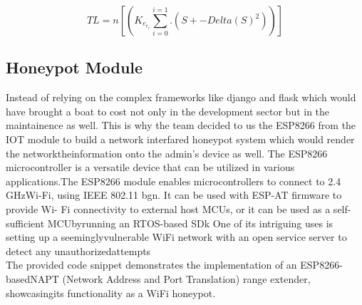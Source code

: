\documentclass[letterpaper, 10 pt, conference]{ieeeconf}  %
\begin{document}
\begin{equation}
TL = n[(K_e_r_r \sum_{i=0}^{i=1} . (S +- Delta(S)^2) )]
\end{equation}
















\subsection{Honeypot Module}
Instead of relying on the complex frameworks like django and flask which would have brought a boat to cost not only in the development sector but in the maintainence as well. This is why the team decided to us the ESP8266 from the IOT module to build a network interfared honeypot system which would render the networktheinformation onto the admin’s device as well. The ESP8266 microcontroller is a versatile device that can be utilized in various
applications.The ESP8266 module enables microcontrollers to connect to 2.4 GHzWi-Fi, using IEEE 802.11 bgn. It can be used with ESP-AT firmware to provide Wi- Fi connectivity to external host MCUs, or it can be used as a self-sufficient MCUbyrunning an RTOS-based SDk One of its intriguing uses is setting up a seeminglyvulnerable WiFi network with an open service server to detect any unauthorizedattempts \cite{c5}\\
The provided code snippet demonstrates the implementation of an ESP8266-basedNAPT (Network Address and Port Translation) range extender, showcasingits
functionality as a WiFi honeypot.
\end{document}

